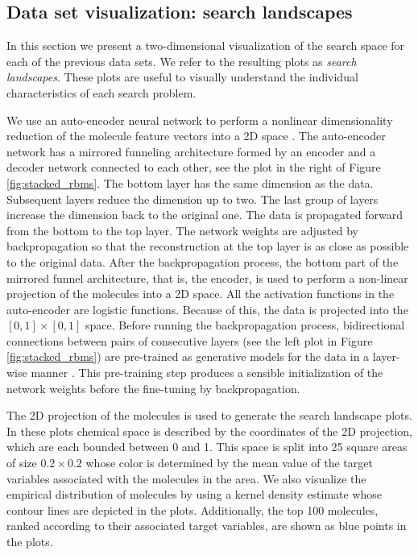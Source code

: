 \subsection{Data set visualization: search landscapes}

In this section we present a two-dimensional visualization of the search space for each of
the previous data sets. We refer to the resulting plots as \emph{search
landscapes}. These plots are useful to visually understand the individual
characteristics of each search problem. 

We use an
auto-encoder neural network to perform a nonlinear dimensionality reduction of the molecule feature vectors
into a 2D space \cite{Hinton_2006}. The auto-encoder network has a mirrored
funneling architecture formed by an encoder and a decoder network connected to
each other, see the plot in the
right of Figure \ref{fig:stacked_rbms}. The bottom layer has the same dimension as the data. Subsequent
layers reduce the dimension up to two. The last group of layers
increase the dimension back to the original one. 
The data is propagated forward from the bottom to the top layer. The network
weights are adjusted by backpropagation so that the reconstruction at the top
layer is as close as possible to the original data. After
the backpropagation process, the bottom part of the mirrored funnel architecture, that is, the
encoder, is used to perform a non-linear projection of the molecules into a 2D
space. All the activation functions in the auto-encoder are logistic functions. Because of this, the data is projected into the $[0,1]\times[0,1]$ space. Before running the backpropagation process, bidirectional
connections between pairs of consecutive layers (see the left plot in Figure
\ref{fig:stacked_rbms}) are pre-trained as
generative models for the data in a layer-wise manner \cite{Hinton_2006}. This pre-training step
produces a sensible initialization of the network weights before the fine-tuning by backpropagation.

The 2D projection of the molecules is used to generate the search
landscape plots. In these plots chemical space is described by the coordinates of the 2D projection,
which are each bounded between 0 and 1. This space is split into 25 square areas of size ${0.2 \times 0.2}$ whose 
color is determined by the mean value of the target variables associated with the molecules in the area. We also visualize the empirical distribution of molecules by using a kernel density estimate whose contour lines are depicted in the plots. Additionally, the top 100 molecules, ranked
according to their associated target variables, are shown as blue points in the plots.  

